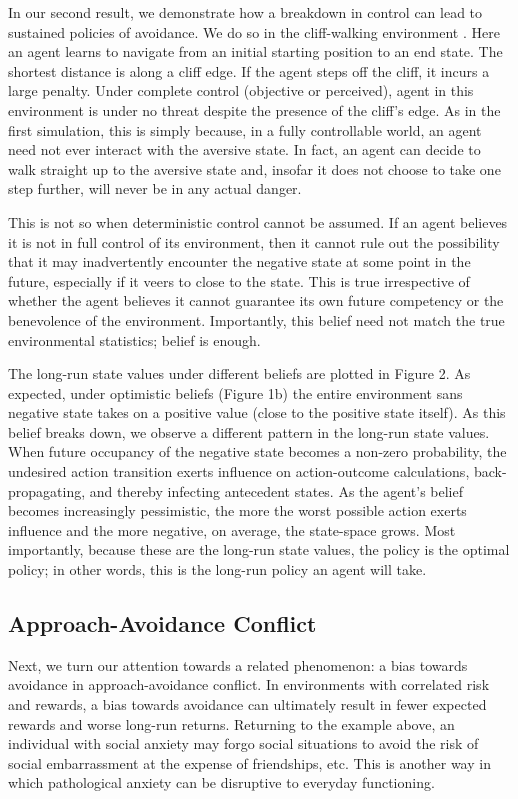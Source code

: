 \documentclass[11pt]{article} %
\begin{document}
In our second result, we demonstrate how a breakdown in control can lead to
sustained policies of avoidance. We do so in the cliff-walking environment
\citep{SuttonBarto1998, SuttonBarto2018, Gaskett2003}. Here an agent learns to navigate from
an initial starting position to an end state. The shortest distance is along a
cliff edge. If the agent steps off the cliff, it incurs a large penalty. Under
complete control (objective or perceived), agent in this environment is under no
threat despite the presence of the cliff's edge. As in the first simulation, this
is simply because, in a fully controllable world, an agent need not ever interact
with the aversive state. In fact, an agent can decide to walk straight up to the
aversive state and, insofar it does not choose to take one step further, will
never be in any actual danger.

This is not so when deterministic control cannot be assumed. If an agent believes
it is not in full control of its environment, then it cannot rule out the possibility
that it may inadvertently encounter the negative state at some point in the future,
especially if it veers to close to the state. This is true irrespective of whether
the agent believes it cannot guarantee its own future competency or the benevolence
of the environment. Importantly, this belief need not match the true environmental
statistics; belief is enough.

The long-run state values under different beliefs are plotted in Figure 2. As
expected, under optimistic beliefs (Figure 1b) the entire environment sans negative
state takes on a positive value (close to the positive state itself). As this belief
breaks down, we observe a different pattern in the long-run state values. When
future occupancy of the negative state becomes a non-zero probability, the undesired
action transition exerts influence on action-outcome calculations, back-propagating,
and thereby infecting antecedent states. As the agent's belief becomes increasingly
pessimistic, the more the worst possible action exerts influence and the more
negative, on average, the state-space grows. Most importantly, because these are
the long-run state values, the policy is the optimal policy; in other words, this
is the long-run policy an agent will take.

\subsection{Approach-Avoidance Conflict}

Next, we turn our attention towards a related phenomenon: a bias towards avoidance
in approach-avoidance conflict. In environments with correlated risk and rewards,
a bias towards avoidance can ultimately result in fewer expected rewards and worse
long-run returns. Returning to the example above, an individual with social anxiety
may forgo social situations to avoid the risk of social embarrassment at the expense
of friendships, etc. This is another way in which pathological anxiety can be
disruptive to everyday functioning.
\end{document}
